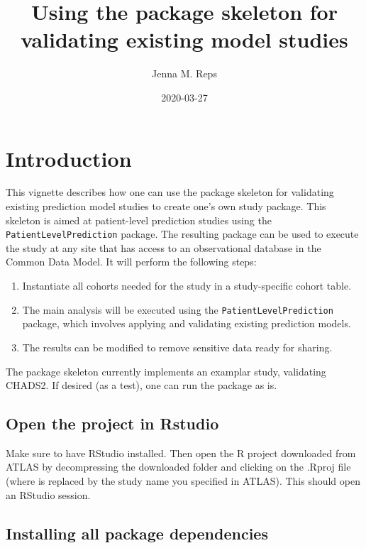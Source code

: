 \documentclass[
]{article}
\title{Using the package skeleton for validating existing model studies}
\author{Jenna M. Reps}
\date{2020-03-27}
\providecommand{\tightlist}{%
  \setlength{\itemsep}{0pt}\setlength{\parskip}{0pt}}
\begin{document}
\maketitle

{
\setcounter{tocdepth}{2}
\tableofcontents
}
\hypertarget{introduction}{%
\section{Introduction}\label{introduction}}

This vignette describes how one can use the package skeleton for
validating existing prediction model studies to create one's own study
package. This skeleton is aimed at patient-level prediction studies
using the \texttt{PatientLevelPrediction} package. The resulting package
can be used to execute the study at any site that has access to an
observational database in the Common Data Model. It will perform the
following steps:

\begin{enumerate}
\def\labelenumi{\arabic{enumi}.}
\tightlist
\item
  Instantiate all cohorts needed for the study in a study-specific
  cohort table.
\item
  The main analysis will be executed using the
  \texttt{PatientLevelPrediction} package, which involves applying and
  validating existing prediction models.
\item
  The results can be modified to remove sensitive data ready for
  sharing.
\end{enumerate}

The package skeleton currently implements an examplar study, validating
CHADS2. If desired (as a test), one can run the package as is.

\hypertarget{open-the-project-in-rstudio}{%
\subsection{Open the project in
Rstudio}\label{open-the-project-in-rstudio}}

Make sure to have RStudio installed. Then open the R project downloaded
from ATLAS by decompressing the downloaded folder and clicking on the
.Rproj file (where is replaced by the study name you specified in
ATLAS). This should open an RStudio session.

\hypertarget{installing-all-package-dependencies}{%
\subsection{Installing all package
dependencies}\label{installing-all-package-dependencies}}
\end{document}
